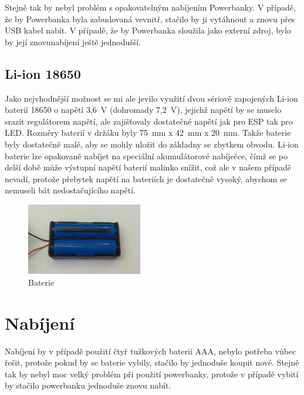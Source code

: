 Stejně tak by nebyl problém s opakovatelným nabíjením Powerbanky.  V případě, že by Powerbanka byla zabudovaná vevnitř, stačilo by ji vytáhnout a znovu přes USB kabel nabít. 
V případě, že by Powerbanka sloužila jako externí zdroj, bylo by její znovunabíjení ještě jednodušší.


\subsection{Li-ion 18650}

Jako nejvhodnější možnost se mi ale jevilo využití dvou sériově zapojených Li-ion baterií 18650\cite{liion} o napětí 3,6~V (dohromady 7,2~V), jejichž napětí by se muselo srazit regulátorem napětí, ale zajišťovaly dostatečné napětí jak pro ESP tak pro LED. Rozměry baterií v držáku byly 75~mm x 42~mm x 20~mm.  Takže baterie byly dostatečně malé, aby se mohly uložit do základny se zbytkem obvodu. Li-ion baterie lze opakovaně nabíjet na speciální akumulátorové nabíječce, čímž se po delší době může výstupní napětí baterií malinko snížit, což ale v našem případě nevadí, protože přebytek napětí na bateriích je dostatečně vysoký, abychom se nemuseli bát nedostačujícího napětí. 


\begin{figure}[htbp]
	\centering
	\includegraphics[width=0.45\textwidth]{img/02 ele/Battery_Pack.jpg}
	\caption{Baterie}
\end{figure}





\section{Nabíjení}
Nabíjení by v případě použití čtyř tužkových baterií AAA, nebylo potřeba vůbec řešit, protože pokud by se baterie vybily, stačilo by jednoduše koupit nové. Stejně tak by nebyl moc velký problém při použití powerbanky, protože v případě vybití by stačilo powerbanku jednoduše znovu nabít.


